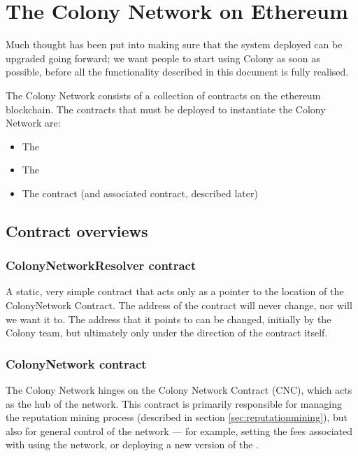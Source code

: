 \section{The Colony Network on Ethereum}

Much thought has been put into making sure that the system deployed can be upgraded going forward; we want people to start using Colony as soon as possible, before all the functionality described in this document is fully realised.

The Colony Network consists of a collection of contracts on the ethereum blockchain. The contracts that must be deployed to instantiate the Colony Network are:

\begin{itemize}
\item The 
\item The 
\item The  contract (and associated  contract, described later)
\end{itemize}
\subsection{Contract overviews}

\subsubsection{ColonyNetworkResolver contract}
A static, very simple contract that acts only as a pointer to the location of the ColonyNetwork Contract. The address of the  contract will never change, nor will we want it to. The address that it points to can be changed, initially by the Colony team, but ultimately only under the direction of the  contract itself.

\subsubsection {ColonyNetwork contract}

The Colony Network hinges on the Colony Network Contract (CNC), which acts as the hub of the network. This contract is primarily responsible for managing the reputation mining process (described in section \ref{sec:reputationmining}), but also for general control of the network --- for example, setting the fees associated with using the network, or deploying a new version of the .

